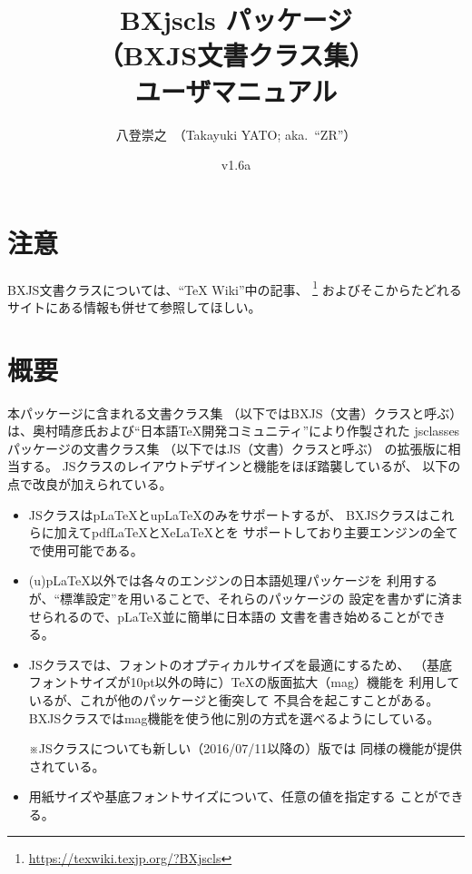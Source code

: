 \documentclass[a4paper]{ltjsarticle}
\renewcommand*{\XeLaTeX}{XeLaTeX}}
\newcommand{\PkgVersion}{1.6a}
\newcommand{\PkgDate}{2017/09/24}
\newcommand{\Pkg}[1]{\textsf{#1}}
\newcommand{\Note}{\par\noindent ※}
\newcommand{\jemph}{\textsf}
\providecommand{\pLaTeX}{p\LaTeX}
\providecommand{\upLaTeX}{u\pLaTeX}
\providecommand{\pdfLaTeX}{pdf\LaTeX}
\begin{document}
\title{\Pkg{BXjscls} パッケージ\\
  （BXJS文書クラス集）\\
  ユーザマニュアル}
\author{八登崇之\ （Takayuki YATO; aka.~``ZR''）}
\date{v\PkgVersion\quad[\PkgDate]}
\maketitle
\tableofcontents

\section*{注意}

BXJS文書クラスについては、“{\TeX} Wiki”中の記事、
\footnote{\url{https://texwiki.texjp.org/?BXjscls}}%
およびそこからたどれるサイトにある情報も併せて参照してほしい。

\section{概要}
\label{sec:Ovewview}

本パッケージに含まれる文書クラス集
（以下では\jemph{BXJS（文書）クラス}と呼ぶ）
は、奥村晴彦氏および“日本語{\TeX}開発コミュニティ”により作製された
\Pkg{jsclasses}パッケージの文書クラス集
（以下では\jemph{JS（文書）クラス}と呼ぶ）
の拡張版に相当する。
JSクラスのレイアウトデザインと機能をほぼ踏襲しているが、
以下の点で改良が加えられている。
\begin{itemize}
\item JSクラスは{\pLaTeX}と{\upLaTeX}のみをサポートするが、
  BXJSクラスはこれらに加えて{\pdfLaTeX}と{\XeLaTeX}と{\LuaLaTeX}を
  サポートしており主要エンジンの全てで使用可能である。
\item (u){\pLaTeX}以外では各々のエンジンの日本語処理パッケージを
  利用するが、“標準設定”を用いることで、それらのパッケージの
  設定を書かずに済ませられるので、{\pLaTeX}並に簡単に日本語の
  文書を書き始めることができる。
\item JSクラスでは、フォントのオプティカルサイズを最適にするため、
  （基底フォントサイズが10pt以外の時に）{\TeX}の版面拡大（mag）機能を
  利用しているが、これが他のパッケージと衝突して
  不具合を起こすことがある。
  BXJSクラスではmag機能を使う他に別の方式を選べるようにしている。
  \Note JSクラスについても新しい（2016/07/11以降の）版では
  同様の機能が提供されている。
\item 用紙サイズや基底フォントサイズについて、任意の値を指定する
  ことができる。
\end{itemize}
\end{document}
